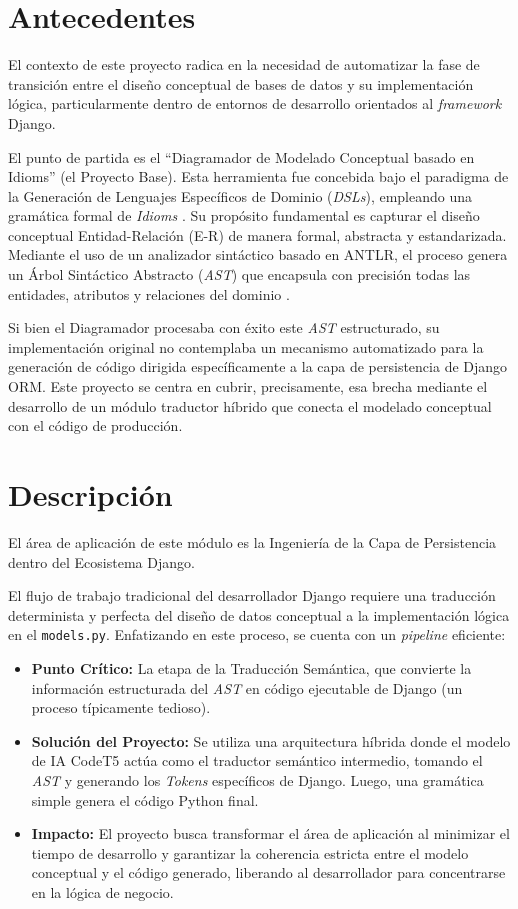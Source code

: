 \section{Antecedentes}
\label{sec:antecedentes}

El contexto de este proyecto radica en la necesidad de automatizar la fase de transición entre el diseño conceptual de bases de datos y su implementación lógica, particularmente dentro de entornos de desarrollo orientados al \textit{framework} Django.

El punto de partida es el ``Diagramador de Modelado Conceptual basado en Idioms'' (el Proyecto Base). Esta herramienta fue concebida bajo el paradigma de la Generación de Lenguajes Específicos de Dominio (\textit{DSLs}), empleando una gramática formal de \textit{Idioms} \cite{fowler2010dsl}. Su propósito fundamental es capturar el diseño conceptual Entidad-Relación (E-R) de manera formal, abstracta y estandarizada. Mediante el uso de un analizador sintáctico basado en ANTLR, el proceso genera un Árbol Sintáctico Abstracto (\textit{AST}) que encapsula con precisión todas las entidades, atributos y relaciones del dominio \cite{parr2013definitive}.

Si bien el Diagramador procesaba con éxito este \textit{AST} estructurado, su implementación original no contemplaba un mecanismo automatizado para la generación de código dirigida específicamente a la capa de persistencia de Django ORM. Este proyecto se centra en cubrir, precisamente, esa brecha mediante el desarrollo de un módulo traductor híbrido que conecta el modelado conceptual con el código de producción.
\section{Descripción}
\label{sec:descripcion}

El área de aplicación de este módulo es la Ingeniería de la Capa de Persistencia dentro del Ecosistema Django.

El flujo de trabajo tradicional del desarrollador Django requiere una traducción determinista y perfecta del diseño de datos conceptual a la implementación lógica en el \texttt{models.py}. Enfatizando en este proceso, se cuenta con un \textit{pipeline} eficiente:

\begin{itemize}
    \item \textbf{Punto Crítico:} La etapa de la Traducción Semántica, que convierte la información estructurada del \textit{AST} en código ejecutable de Django (un proceso típicamente tedioso).
    \item \textbf{Solución del Proyecto:} Se utiliza una arquitectura híbrida donde el modelo de IA CodeT5 actúa como el traductor semántico intermedio, tomando el \textit{AST} y generando los \textit{Tokens} específicos de Django. Luego, una gramática simple genera el código Python final.
    \item \textbf{Impacto:} El proyecto busca transformar el área de aplicación al minimizar el tiempo de desarrollo y garantizar la coherencia estricta entre el modelo conceptual y el código generado, liberando al desarrollador para concentrarse en la lógica de negocio.
\end{itemize}
